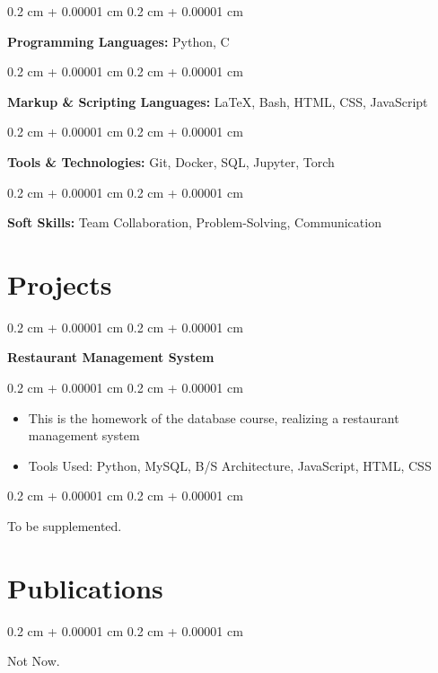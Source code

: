 \documentclass[10pt, letterpaper]{article}
\newenvironment{highlights}{
    \begin{itemize}[
        topsep=0.10 cm,
        parsep=0.10 cm,
        partopsep=0pt,
        itemsep=0pt,
        leftmargin=0.4 cm + 10pt
    ]
}{
    \end{itemize}
} %
\newenvironment{onecolentry}{
    \begin{adjustwidth}{
        0.2 cm + 0.00001 cm
    }{
        0.2 cm + 0.00001 cm
    }
}{
    \end{adjustwidth}
} %
\newenvironment{twocolentry}[2][]{
    \onecolentry
    \def\secondColumn{#2}
    \setcolumnwidth{\fill, 4.5 cm}
    \begin{paracol}{2}
}{
    \switchcolumn \raggedleft \secondColumn
    \end{paracol}
    \endonecolentry
} %
\let\hrefWithoutArrow\href
\renewcommand{\href}[2]{\hrefWithoutArrow{#1}{\ifthenelse{\equal{#2}{}}{ }{#2 }\raisebox{.15ex}{\footnotesize \faExternalLink*}}}
\begin{document}
    \begin{onecolentry}
        \textbf{Programming Languages:} Python, C
    \end{onecolentry}
    
    \vspace{0.1cm}
    
    \begin{onecolentry}
        \textbf{Markup \& Scripting Languages:} \LaTeX, Bash, HTML, CSS, JavaScript
    \end{onecolentry}
    
    \vspace{0.1cm}
    
    \begin{onecolentry}
        \textbf{Tools \& Technologies:} Git, Docker, SQL, Jupyter, Torch
    \end{onecolentry}
    
    \vspace{0.1cm}
    
    \begin{onecolentry}
        \textbf{Soft Skills:} Team Collaboration, Problem-Solving, Communication
    \end{onecolentry}
    


    
    \section{Projects}

        \begin{twocolentry}{
            
            
        \textit{\href{https://github.com/sds7788/restaurant_management_system}{repo}}}
            \textbf{Restaurant Management System}
        \end{twocolentry}

        \vspace{0.10 cm}
        \begin{onecolentry}
            \begin{highlights}
                \item This is the homework of the database course, realizing a restaurant management system
                \item Tools Used: Python, MySQL, B/S Architecture, JavaScript, HTML, CSS 
            \end{highlights}
        \end{onecolentry}


        \vspace{0.2 cm}

        \begin{onecolentry}
            To be supplemented.
        \end{onecolentry}



    \section{Publications}
        \begin{onecolentry}
            Not Now.
        \end{onecolentry}
\end{document}
